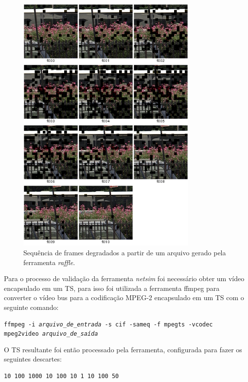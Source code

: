\begin{figure}[!htb]
	\centering
	\includegraphics[width=0.8\textwidth]{./imgs/busraffle.png}
	\caption[Sequência de frames degradados]{Sequência de frames degradados a partir de um arquivo gerado pela ferramenta \emph{raffle}.}
	\label{fig:busraffle}
\end{figure}

Para o processo de validação da ferramenta \emph{netsim} foi necessário obter um vídeo encapsulado em um TS, para isso foi utilizada a ferramenta ffmpeg para converter o vídeo bus para a codificação MPEG-2 encapsulado em um TS com o seguinte comando:

{
	\centering
	\texttt{ffmpeg -i \emph{arquivo\_de\_entrada} -s cif -sameq -f mpegts -vcodec mpeg2video \emph{arquivo\_de\_saída}}
}

O TS resultante foi então processado pela ferramenta, configurada para fazer os seguintes descartes:

\begin{center}
	\texttt{10 100
	1000 10
	100 10
	1 10
	100 50}
\end{center}

